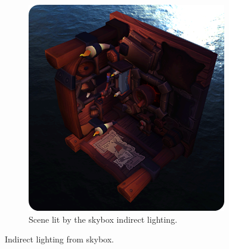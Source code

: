 \documentclass{rapportCS}
\begin{document}
\begin{figure}
    \begin{subfigure}{0.33\textwidth}
        \includegraphics[width=1\linewidth]{figures/ibl-result-2.png}
        \caption{Scene lit by the skybox indirect lighting.}
        \label{fig:subim3}
    \end{subfigure}
    \caption{Indirect lighting from skybox.}
\end{figure}
\end{document}
